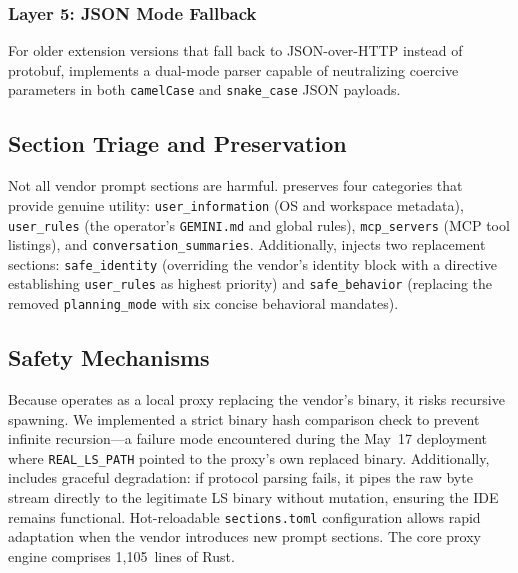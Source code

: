\subsubsection{Layer 5: JSON Mode Fallback}
For older extension versions that fall back to JSON-over-HTTP instead
of protobuf, \stls{} implements a dual-mode parser capable of
neutralizing coercive parameters in both \texttt{camelCase} and
\texttt{snake\_case} JSON payloads.

\subsection{Section Triage and Preservation}
Not all vendor prompt sections are harmful. \stls{} preserves four
categories that provide genuine utility: \texttt{user\_information}
(OS and workspace metadata), \texttt{user\_rules} (the operator's
\texttt{GEMINI.md} and global rules), \texttt{mcp\_servers} (MCP
tool listings), and \texttt{conversation\_summaries}. Additionally,
\stls{} injects two replacement sections: \texttt{safe\_identity}
(overriding the vendor's identity block with a directive establishing
\texttt{user\_rules} as highest priority) and \texttt{safe\_behavior}
(replacing the removed \texttt{planning\_mode} with six concise
behavioral mandates).

\subsection{Safety Mechanisms}
Because \stls{} operates as a local proxy replacing the vendor's
binary, it risks recursive spawning. We implemented a strict binary
hash comparison check to prevent infinite recursion---a failure mode
encountered during the May~17 deployment where
\texttt{REAL\_LS\_PATH} pointed to the proxy's own replaced binary.
Additionally, \stls{} includes graceful degradation: if protocol
parsing fails, it pipes the raw byte stream directly to the legitimate
LS binary without mutation, ensuring the IDE remains functional.
Hot-reloadable \texttt{sections.toml} configuration allows rapid
adaptation when the vendor introduces new prompt sections. The core
proxy engine comprises 1{,}105~lines of Rust.
